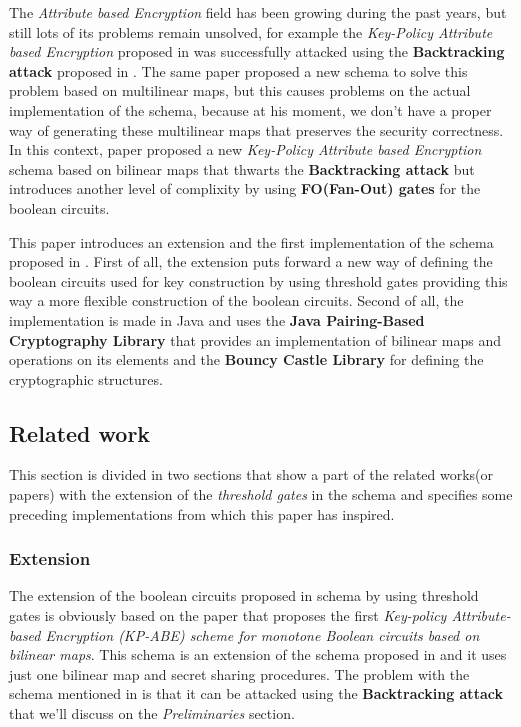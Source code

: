 \documentclass[12pt]{article}
\begin{document}
The \textit{Attribute based Encryption} field has been growing during the past years, but still lots of its problems  remain unsolved, for example the \textit{Key-Policy Attribute based Encryption} proposed in \cite{gpsw} was successfully attacked using the \textbf{Backtracking attack} proposed in \cite{gghsw}. The same paper proposed a new schema to solve this problem based on multilinear maps, but this causes problems on the actual implementation of the schema, because at his moment, we don't have a proper way of generating these multilinear maps that preserves the security correctness. In this context, \cite{fltccd} paper proposed a new \textit{Key-Policy Attribute based Encryption} schema based on bilinear maps that thwarts the \textbf{Backtracking attack} but introduces another level of complixity by using \textbf{FO(Fan-Out) gates} for the boolean circuits. 

This paper introduces an extension and the first implementation of the schema proposed in \cite{fltccd}. First of all, the extension puts forward a new way of defining the boolean circuits used for key construction by using threshold gates providing this way a more flexible construction of the boolean circuits. Second of all, the implementation is made in Java and uses the \textbf{Java Pairing-Based Cryptography Library} that provides an implementation of bilinear maps and operations on its elements and the \textbf{Bouncy Castle Library} for defining the cryptographic structures.

\vspace{80mm}

\subsection{Related work}

This section is divided in two sections that show a part of the related works(or papers) with the extension of the \textit{threshold gates} in the \cite{fltccd} schema and specifies some preceding implementations from which this paper has inspired.  

\subsubsection{Extension}

The extension of the boolean circuits proposed in \cite{fltccd} schema by using threshold gates is obviously based on the \cite{fltccd} paper that proposes the first \textit{Key-policy Attribute-based Encryption (KP-ABE) scheme for monotone Boolean circuits based on bilinear maps}. This schema is an extension of the schema proposed in \cite{gpsw} and it uses just one bilinear map and secret sharing procedures. The problem with the schema mentioned in \cite{gpsw} is that it can be attacked using the \textbf{Backtracking attack} that we'll discuss on the \textit{Preliminaries} section. 
\end{document}
